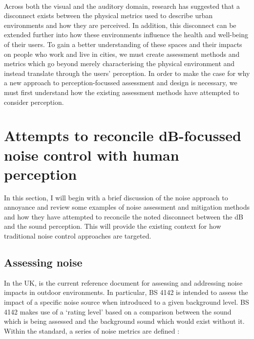 \paragraph*{}Across both the visual and the auditory domain, research has suggested that a disconnect exists between the physical metrics used to describe urban environments and how they are perceived. In addition, this disconnect can be extended further into how these environments influence the health and well-being of their users. To gain a better understanding of these spaces and their impacts on people who work and live in cities, we must create assessment methods and metrics which go beyond merely characterising the physical environment and instead translate through the users' perception. In order to make the case for why a new approach to perception-focussed assessment and design is necessary, we must first understand how the existing assessment methods have attempted to consider perception.


\section{Attempts to reconcile dB-focussed noise control with human perception}
In this section, I will begin with a brief discussion of the noise approach to annoyance and review some examples of noise assessment and mitigation methods and how they have attempted to reconcile the noted disconnect between the dB and the sound perception. This will provide the existing context for how traditional noise control approaches are targeted. 

\subsection{Assessing noise} In the UK, \citet{BS41422019} is the current reference document for assessing and addressing noise impacts in outdoor environments. In particular, BS 4142 is intended to assess the impact of a specific noise source when introduced to a given background level. BS 4142 makes use of a `rating level' based on a comparison between the sound which is being assessed and the background sound which would exist without it. Within the standard, a series of noise metrics are defined \citep[Sec. 3]{BS41422019}:

